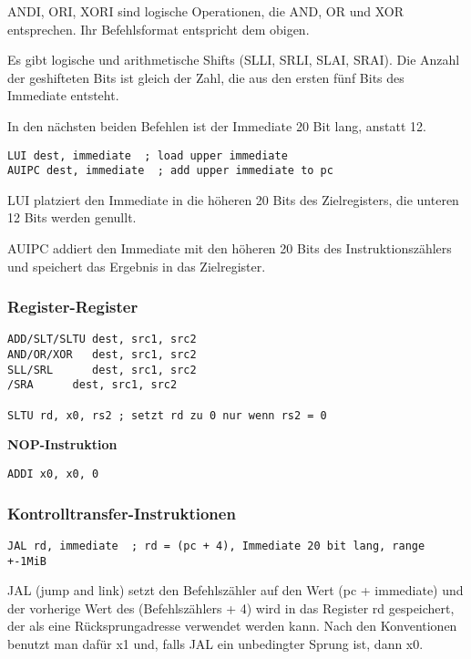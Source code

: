 ANDI, ORI, XORI sind logische Operationen, die AND, OR und XOR entsprechen. Ihr
Befehlsformat entspricht dem obigen.

Es gibt logische und arithmetische Shifts (SLLI, SRLI, SLAI, SRAI). Die Anzahl
der geshifteten Bits ist gleich der Zahl, die aus den ersten fünf Bits des
Immediate entsteht.

In den nächsten beiden Befehlen ist der Immediate 20 Bit lang, anstatt 12.

\begin{lstlisting}
LUI dest, immediate  ; load upper immediate
AUIPC dest, immediate  ; add upper immediate to pc
\end{lstlisting}

LUI platziert den Immediate in die höheren 20 Bits des Zielregisters, die unteren 12 Bits werden genullt.

AUIPC addiert den Immediate mit den höheren 20 Bits des Instruktionszählers und speichert das Ergebnis in das Zielregister.

\subsubsection{Register-Register}

\begin{lstlisting}
ADD/SLT/SLTU dest, src1, src2
AND/OR/XOR   dest, src1, src2
SLL/SRL      dest, src1, src2
/SRA      dest, src1, src2

SLTU rd, x0, rs2 ; setzt rd zu 0 nur wenn rs2 = 0
\end{lstlisting}

\textbf{NOP-Instruktion}

\begin{lstlisting}
ADDI x0, x0, 0
\end{lstlisting}

\subsubsection{Kontrolltransfer-Instruktionen}

\begin{lstlisting}
JAL rd, immediate  ; rd = (pc + 4), Immediate 20 bit lang, range +-1MiB
\end{lstlisting}

JAL (jump and link) setzt den Befehlszähler auf den Wert (pc + immediate) und
der vorherige Wert des (Befehlszählers + 4) wird in das Register rd gespeichert,
der als eine Rücksprungadresse verwendet werden kann. Nach den Konventionen
benutzt man dafür x1 und, falls JAL ein unbedingter Sprung ist, dann x0.

